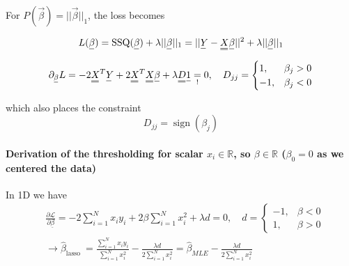 
For $P(\vec{\beta}) = || \vec{\beta} ||_1$, the loss becomes

\begin{equation}
    L(\vec{\beta}) = \operatorname{SSQ}(\vec{\beta}) + \lambda || \vec{\beta} ||_1 = || \vec{Y} - \mat{X} \vec{\beta} ||^2 + \lambda || \vec{\beta} ||_1
\end{equation}


\begin{equation}
    \partial_\vec{\beta} L = -2 \mat{X}^T \vec{Y} + 2 \mat{X}^T \mat{X} \vec{\beta} + \lambda \mat{D} \vec{1} \underset{!}{=} 0, \quad D_{jj} = \begin{cases} 1, & \beta_j > 0 \\ -1, & \beta_j < 0 \end{cases}
\end{equation}

which also places the constraint
\begin{equation}
    D_{jj} = \operatorname{sign}(\beta_j)
\end{equation}

\paragraph{Derivation of the thresholding for scalar $x_i \in \mathbb{R}$, so $\beta \in \mathbb{R}$ ($\beta_0 = 0$ as we centered the data)} In 1D
we have
\begin{equation}
    \begin{aligned}
    & \frac{\partial \mathcal{L}}{\partial \underline{\beta}}=-2 \sum_{i=1}^N x_i y_i+2 \beta \sum_{i=1}^N x_i^2+\lambda d=0, \quad d=\left\{\begin{array}{cc}
    -1, & \beta<0 \\
    1, & \beta>0
    \end{array}\right. \\
    & \rightarrow \hat{\beta}_{\text {lasso }}=\frac{\sum_{i=1}^N x_i y_i}{\sum_{i=1}^N x_i^2}-\frac{\lambda d}{2 \sum_{i=1}^N x_i^2}=\hat{\beta}_{M L E}-\frac{\lambda d}{2 \sum_{i=1}^N x_i^2} \\
    &
    \end{aligned}
\end{equation}

